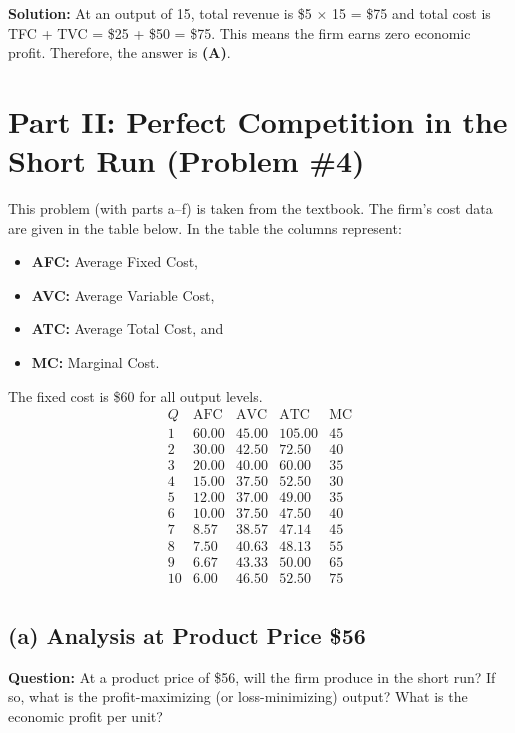 \documentclass[12pt]{article}
\begin{document}
\textbf{Solution:} At an output of 15, total revenue is \$5 $\times$ 15 = \$75 and total cost is TFC + TVC = \$25 + \$50 = \$75. This means the firm earns zero economic profit. Therefore, the answer is \textbf{(A)}.

\bigskip
\section*{Part II: Perfect Competition in the Short Run (Problem \#4)}
This problem (with parts a--f) is taken from the textbook. The firm’s cost data are given in the table below. In the table the columns represent:
\begin{itemize}[noitemsep]
  \item \textbf{AFC:} Average Fixed Cost,
  \item \textbf{AVC:} Average Variable Cost,
  \item \textbf{ATC:} Average Total Cost, and
  \item \textbf{MC:} Marginal Cost.
\end{itemize}
The fixed cost is \$60 for all output levels.
\[
\begin{array}{c|cccc}
Q & \text{AFC} & \text{AVC} & \text{ATC} & \text{MC} \\
\hline
1  & 60.00 & 45.00  & 105.00 & 45 \\
2  & 30.00 & 42.50  & 72.50  & 40 \\
3  & 20.00 & 40.00  & 60.00  & 35 \\
4  & 15.00 & 37.50  & 52.50  & 30 \\
5  & 12.00 & 37.00  & 49.00  & 35 \\
6  & 10.00 & 37.50  & 47.50  & 40 \\
7  & 8.57  & 38.57  & 47.14  & 45 \\
8  & 7.50  & 40.63  & 48.13  & 55 \\
9  & 6.67  & 43.33  & 50.00  & 65 \\
10 & 6.00  & 46.50  & 52.50  & 75 \\
\end{array}
\]

\subsection*{(a) Analysis at Product Price \$56}
\textbf{Question:} At a product price of \$56, will the firm produce in the short run? If so, what is the profit-maximizing (or loss-minimizing) output? What is the economic profit per unit?
\end{document}
